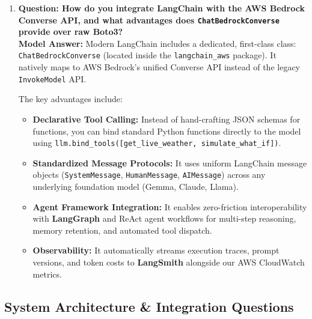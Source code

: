 \documentclass[11pt,a4paper]{article}
\begin{document}
\begin{enumerate}[leftmargin=*]
    \item \textbf{Question: How do you integrate LangChain with the AWS Bedrock Converse API, and what advantages does \texttt{ChatBedrockConverse} provide over raw Boto3?}
    \\ \textbf{Model Answer:} Modern LangChain includes a dedicated, first-class class: \texttt{ChatBedrockConverse} (located inside the \texttt{langchain\_aws} package). It natively maps to AWS Bedrock's unified Converse API instead of the legacy \texttt{InvokeModel} API.
    
    The key advantages include:
    \begin{itemize}
        \item \textbf{Declarative Tool Calling:} Instead of hand-crafting JSON schemas for functions, you can bind standard Python functions directly to the model using \texttt{llm.bind\_tools([get\_live\_weather, simulate\_what\_if])}.
        \item \textbf{Standardized Message Protocols:} It uses uniform LangChain message objects (\texttt{SystemMessage}, \texttt{HumanMessage}, \texttt{AIMessage}) across any underlying foundation model (Gemma, Claude, Llama).
        \item \textbf{Agent Framework Integration:} It enables zero-friction interoperability with \textbf{LangGraph} and ReAct agent workflows for multi-step reasoning, memory retention, and automated tool dispatch.
        \item \textbf{Observability:} It automatically streams execution traces, prompt versions, and token costs to \textbf{LangSmith} alongside our AWS CloudWatch metrics.
    \end{itemize}
\end{enumerate}

\subsection{System Architecture \& Integration Questions}
\end{document}
